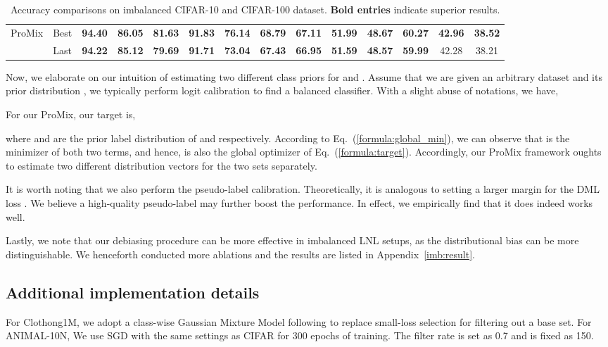 \documentclass{article}
\begin{document}
\begin{table*}[t!]
\begin{tabular}{ l c || c c c | c c c ||c c c|c c c}
 \midrule
\multirow{2}{*}{ProMix}  & Best  & \textbf{94.40} & \textbf{86.05} & \textbf{81.63} & \textbf{91.83} & \textbf{76.14} & \textbf{68.79} & \textbf{67.11} & \textbf{51.99} & \textbf{48.67} & \textbf{60.27} & \textbf{42.96} & \textbf{38.52}\\
 & Last  & \textbf{94.22} & \textbf{85.12} & \textbf{79.69} & \textbf{91.71} & \textbf{73.04} & \textbf{67.43} & \textbf{66.95} & \textbf{51.59} & \textbf{48.57} & \textbf{59.99} & 42.28 & 38.21  \\
\bottomrule
\end{tabular}
\caption{ Accuracy comparisons on imbalanced CIFAR-10 and CIFAR-100 dataset. \textbf{Bold entries} indicate superior results. }\label{tab:imb}
\end{table*}







Now, we elaborate on our intuition of estimating two different class priors for  and . Assume that we are given an arbitrary dataset  and its prior distribution , we typically perform logit calibration \cite{DBLP:conf/iclr/MenonJRJVK21} to find a balanced classifier. With a slight abuse of notations, we have,

For our ProMix, our target is,

where  and  are the prior label distribution of  and  respectively. According to Eq.~(\ref{formula:global_min}), we can observe that  is the minimizer of both two terms, and hence, is also the global optimizer of Eq.~(\ref{formula:target}). Accordingly, our ProMix framework oughts to estimate two different distribution vectors for the two sets separately.

It is worth noting that we also perform the pseudo-label calibration. Theoretically, it is analogous to setting a larger margin for the DML loss . We believe a high-quality pseudo-label may further boost the performance. In effect, we empirically find that it does indeed works well. 

Lastly, we note that our debiasing procedure can be more effective in imbalanced LNL setups, as the distributional bias can be more distinguishable. We henceforth conducted more ablations and the results are listed in Appendix~\ref{imb:result}.

\subsection{Additional implementation details}
For Clothong1M, we adopt a class-wise Gaussian Mixture Model following \cite{DBLP:conf/iclr/LiSH20} to replace small-loss selection for filtering out a base set. For ANIMAL-10N, We use SGD with the same settings as CIFAR for 300 epochs of training. The filter rate  is set as 0.7 and  is fixed as 150.
\end{document}
